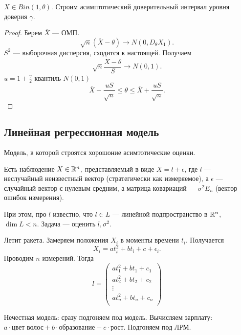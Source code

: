 \begin{example}
    \(X \in Bin(1, \theta)\). Строим асимптотический доверительный интервал уровня доверия \(\gamma\).
\end{example}
\begin{proof}
    Берем \(\overline{X}\) --- ОМП.
    \begin{displaymath}
        \sqrt{n} \left(\overline{X} - \theta\right) \to N(0, D_\theta X_1).
    \end{displaymath}
    \(S^2\) --- выборочная дисперсия, сходится к настоящей.
    Получаем
    \begin{displaymath}
        \sqrt{n}\frac{\overline{X} - \theta}{S} \to N(0, 1).
    \end{displaymath}
    \(u = 1 + \frac{\gamma}{2}\)-квантиль \(N(0, 1)\)
    \begin{displaymath}
        \overline{X} - \frac{u S}{\sqrt{n}} \leq \theta \leq \overline{X} + \frac{u S}{\sqrt{n}}.
    \end{displaymath}
\end{proof}

\subsection{Линейная регрессионная модель}
Модель, в которой строятся хорошоние асимтотические оценки.

Есть наблюдение \(X \in \mathbb{R}^n\), представляемый в виде \(X = l + \epsilon\), где \(l\) --- неслучайный неизвестный вектор (стратегически как измеряемое), а \(\epsilon\) --- случайный вектор с нулевым средним, а матрица ковариаций --- \(\sigma^2 E_n\) (вектор ошибок измерения).

При этом, про \(l\) известно, что \(l \in L\) --- линейной подпространство в \(\mathbb{R}^n\), \(\dim L < n\). Задача --- оценить \(l, \sigma^2\).

\begin{example}
    Летит ракета. Замеряем положения \(X_i\) в моменты времени \(t_i\). Получается
    \begin{displaymath}
        X_i = a t^2_i + b t_i + c + \epsilon_i.
    \end{displaymath}
    Проводим \(n\) измерений. Тогда
    \begin{displaymath}
        l = \begin{pmatrix}
            a t_1^2 + b t_1 + c_1 \\
            a t_2^2 + b t_2 + c_2 \\
            \vdots \\
            a t_n^2 + b t_n + c_n \\
        \end{pmatrix}
    \end{displaymath}
\end{example}
\begin{example}
    Нечестная модель: сразу подгоняем под модель. Вычисляем зарплату: \(a \cdot \text{цвет волос} + b \cdot \text{образование} + c \cdot \text{рост}\). Подгоняем под ЛРМ.
\end{example}


